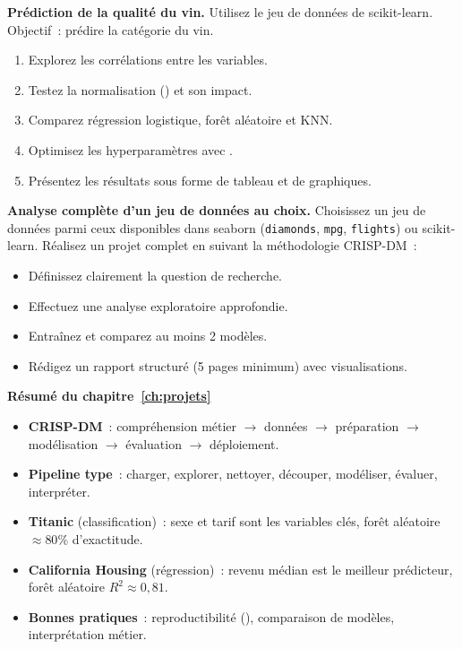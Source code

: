 \begin{exercice}
\textbf{Pr\'ediction de la qualit\'e du vin.} Utilisez le jeu de donn\'ees  de scikit-learn. Objectif~: pr\'edire la cat\'egorie du vin.
\begin{enumerate}
    \item Explorez les corr\'elations entre les variables.
    \item Testez la normalisation () et son impact.
    \item Comparez r\'egression logistique, for\^et al\'eatoire et KNN.
    \item Optimisez les hyperparam\`etres avec .
    \item Pr\'esentez les r\'esultats sous forme de tableau et de graphiques.
\end{enumerate}
\end{exercice}

\begin{exercice}
\textbf{Analyse compl\`ete d'un jeu de donn\'ees au choix.} Choisissez un jeu de donn\'ees parmi ceux disponibles dans seaborn (\texttt{diamonds}, \texttt{mpg}, \texttt{flights}) ou scikit-learn. R\'ealisez un projet complet en suivant la m\'ethodologie CRISP-DM~:
\begin{itemize}
    \item D\'efinissez clairement la question de recherche.
    \item Effectuez une analyse exploratoire approfondie.
    \item Entra\^inez et comparez au moins 2 mod\`eles.
    \item R\'edigez un rapport structur\'e (5 pages minimum) avec visualisations.
\end{itemize}
\end{exercice}

\begin{formules}
\textbf{R\'esum\'e du chapitre~\ref{ch:projets}}
\begin{itemize}
    \item \textbf{CRISP-DM}~: compr\'ehension m\'etier $\to$ donn\'ees $\to$ pr\'eparation $\to$ mod\'elisation $\to$ \'evaluation $\to$ d\'eploiement.
    \item \textbf{Pipeline type}~: charger, explorer, nettoyer, d\'ecouper, mod\'eliser, \'evaluer, interpr\'eter.
    \item \textbf{Titanic} (classification)~: sexe et tarif sont les variables cl\'es, for\^et al\'eatoire $\approx 80\%$ d'exactitude.
    \item \textbf{California Housing} (r\'egression)~: revenu m\'edian est le meilleur pr\'edicteur, for\^et al\'eatoire $R^2 \approx 0{,}81$.
    \item \textbf{Bonnes pratiques}~: reproductibilit\'e (), comparaison de mod\`eles, interpr\'etation m\'etier.
\end{itemize}
\end{formules}
